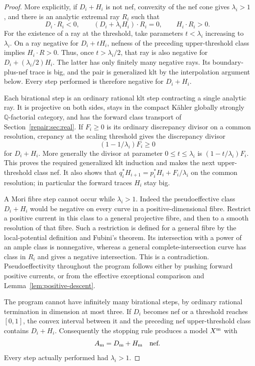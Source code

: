\begin{proof}
More explicitly, if $D_i+H_i$ is not nef, convexity of the nef cone
gives $\lambda_i>1$, and there is an analytic extremal ray $R_i$
such that
\[
 D_i\cdot R_i<0,\qquad
 (D_i+\lambda_iH_i)\cdot R_i=0,\qquad H_i\cdot R_i>0.
\]
For the existence of a ray at the threshold, take parameters $t<\lambda_i$
increasing to $\lambda_i$. On a ray negative for $D_i+tH_i$,
nefness of the preceding upper-threshold class implies $H_i\cdot R>0$.
Thus, once $t>\lambda_i/2$, that ray is also negative for
$D_i+(\lambda_i/2)H_i$. The latter has only finitely many negative
rays. Its boundary-plus-nef trace is big, and
the pair is generalized klt by the interpolation argument below.
Every step performed is therefore negative for $D_i+H_i$.

Each birational step is an ordinary rational klt step contracting a
single analytic ray. It is projective on both sides, stays in the
compact K\"ahler globally strongly $\mathbb Q$-factorial category,
and has the forward class transport of
Section~\ref{repair:sec:real}. If $F_i\geq0$ is its ordinary
discrepancy divisor on a common resolution, crepancy at the scaling
threshold gives the discrepancy divisor
\begin{equation}\label{repair:eq:good-model-scaling-discrepancy}
                  (1-1/\lambda_i)F_i\geq0
\end{equation}
for $D_i+H_i$. More generally the divisor at parameter
$0\leq t\leq\lambda_i$ is $(1-t/\lambda_i)F_i$.
This proves the required generalized klt induction and makes the
next upper-threshold class nef. It also shows that
$q_i^*H_{i+1}=p_i^*H_i+F_i/\lambda_i$ on the common resolution;
in particular the forward traces $H_i$ stay big.

A Mori fibre step cannot occur while $\lambda_i>1$. Indeed the
pseudoeffective class $D_i+H_i$ would be negative on every curve in
a positive-dimensional fibre. Restrict a positive current in this
class to a general projective fibre, and then to a smooth resolution
of that fibre. Such a restriction is defined for a general fibre by
the local-potential definition and Fubini's theorem. Its intersection
with a power of an ample class is nonnegative, whereas a general
complete-intersection curve has class in $R_i$ and gives a negative
intersection. This is a contradiction. Pseudoeffectivity throughout
the program follows either by pushing forward positive currents, or
from the effective exceptional comparison and
Lemma~\ref{lem:positive-descent}.

The program cannot have infinitely many birational steps, by ordinary
rational termination in dimension at most three. If $D_i$ becomes
nef or a threshold reaches $[0,1]$, the convex interval between it
and the preceding nef upper-threshold class contains $D_i+H_i$.
Consequently the stopping rule produces a model $X^{\rm m}$ with
\[
                       A_{\rm m}=D_{\rm m}+H_{\rm m}\quad\text{nef}.
\]
Every step actually performed had $\lambda_i>1$.


\end{proof}
